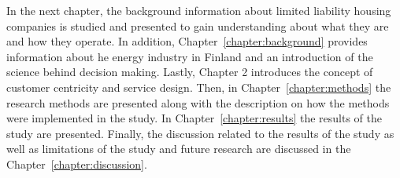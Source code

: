 In the next chapter, the background information about limited liability housing companies is studied and presented to gain understanding about what they are and how they operate. In addition, Chapter~\ref{chapter:background} provides information about he energy industry in Finland and an introduction of the science behind decision making. Lastly, Chapter 2 introduces the concept of customer centricity and service design. Then, in Chapter~\ref{chapter:methods} the research methods are presented along with the description on how the methods were implemented in the study. In Chapter~\ref{chapter:results} the results of the study are presented. Finally, the discussion related to the results of the study as well as limitations of the study and future research are discussed in the Chapter~\ref{chapter:discussion}.
